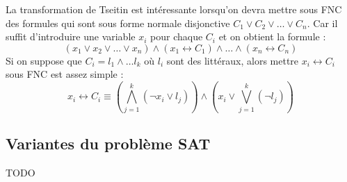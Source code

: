 La transformation de Tseitin est intéressante lorsqu'on devra mettre sous FNC des formules qui sont sous forme normale disjonctive $C_1\vee C_2\vee\dots\vee C_n$. Car il suffit d'introduire une variable $x_i$ pour chaque $C_i$ et on obtient la formule :
\begin{equation*}
    (x_1\vee x_2\vee\dots\vee x_n)\wedge(x_1\leftrightarrow C_1)\wedge\dots\wedge(x_n \leftrightarrow C_n)
\end{equation*} 
Si on suppose que $C_i = l_1\wedge\dots l_k$ où $l_i$ sont des littéraux, alors mettre $x_i\leftrightarrow C_i$ sous FNC est assez simple :
\begin{equation*}
    x_i \leftrightarrow C_i \equiv (\bigwedge_{j=1}^{k}(\neg x_i \vee l_j)) \wedge (x_i \vee \bigvee_{j=1}^{k}(\neg l_j))
\end{equation*}



\subsection{Variantes du problème SAT}
TODO
